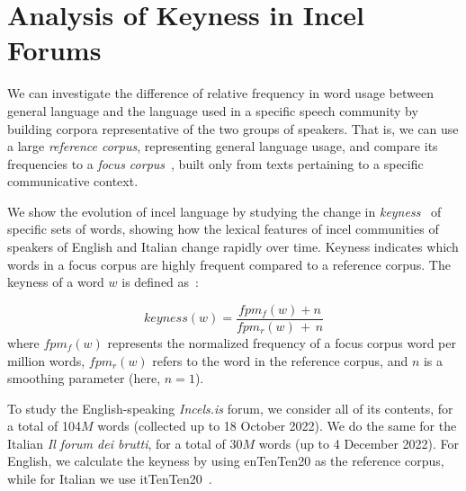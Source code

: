 \documentclass[11pt]{article}
\newcommand{\paolo}[1]{{\color{red} #1}}
\newcommand{\todoA}[1]{\todo[color=blue!40]{A: #1}}
\begin{document}
\appendix

\section{Analysis of Keyness in Incel Forums}
\label{app:keyness}

We can investigate the difference of relative frequency in word usage between general language and the language used in a specific speech community by building corpora representative of the two groups of speakers. That is, we can use a large \textit{reference corpus},
representing general language usage, and compare its frequencies to a \textit{focus corpus}~\cite{kilgarriff2009simple}, built only from texts pertaining to a specific communicative context.

We show the evolution of incel language by studying the change in 
\textit{keyness}~\cite{kilgarriff2009simple} 
of specific sets of words, showing how the lexical features of incel 
communities of speakers of English and Italian
change rapidly over time.
Keyness indicates which words in a focus corpus are highly frequent compared to a reference corpus. 
The keyness of a word $w$ is defined as~\cite{lexical_computing_2015}:%

\begin{equation}
keyness(w) = \frac{fpm_f(w) + n}
                {fpm_r(w)\, + \,n}
\end{equation}
%
\paolo{where $fpm_f(w)$ represents the normalized frequency of a focus corpus word per million words,} $fpm_r(w)$ refers to the word in the reference corpus, and $n$ is a smoothing parameter (here, $n=1$).


To study the English-speaking \textit{Incels.is} forum, we consider \paolo{all of its contents, for a total of}
104$M$ words (collected up to 18 October 2022).
\paolo{We do the same for the}
Italian \textit{Il forum dei brutti},
\paolo{for a total of}
30$M$ words (up to 4 December 2022). For English, we calculate the keyness by using 
enTenTen20
as the reference corpus, while for Italian we use itTenTen20~\cite{tenten2013kilgarriff}.
\end{document}
